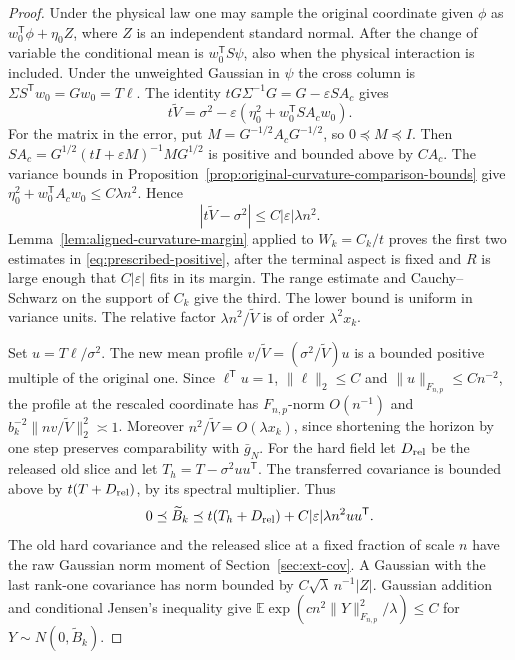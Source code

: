 \documentclass[11pt]{article}
\theoremstyle{definition}
\newcommand{\E}{\mathbb E}
\begin{document}
\begin{proof}
Under the physical law one may sample the original coordinate
given \(\phi\) as \(w_0^{\mathsf T}\phi+\eta_0 Z\), where \(Z\)
is an independent standard normal. After the change of variable
the conditional mean is \(w_0^{\mathsf T}S\psi\), also when
the physical interaction is included. Under the unweighted
Gaussian in \(\psi\) the cross column is
\(\Sigma S^{\mathsf T}w_0=Gw_0=T\ell\). The identity
\(tG\Sigma^{-1}G=G-\varepsilon S A_c\) gives
\begin{equation}
 t\widetilde V=\sigma^2-\varepsilon
             (\eta_0^2+w_0^{\mathsf T}S A_cw_0).
\end{equation}
For the matrix in the error, put \(M=G^{-1/2}A_cG^{-1/2}\),
so \(0\preceq M\preceq I\). Then
\(S A_c=G^{1/2}(tI+\varepsilon M)^{-1}M G^{1/2}\)
is positive and bounded above by \(C A_c\). The variance
bounds in Proposition~\ref{prop:original-curvature-comparison-bounds}
give \(\eta_0^2+w_0^{\mathsf T}A_cw_0\le C\lambda n^2\).
Hence
\begin{equation}
 |t\widetilde V-\sigma^2|\le C|\varepsilon|\lambda n^2 .
\end{equation}
Lemma~\ref{lem:aligned-curvature-margin} applied to
\(W_k=C_k/t\) proves the first two estimates in
\eqref{eq:prescribed-positive}, after the terminal aspect is
fixed and \(R\) is large enough that \(C|\varepsilon|\) fits
in its margin. The range estimate and Cauchy--Schwarz on the
support of \(C_k\) give the third. The lower bound is uniform
in variance units. The relative factor \(\lambda n^2/\widetilde V\)
is of order \(\lambda^2 x_k\).

Set \(u=T\ell/\sigma^2\). The new mean profile
\(v/\widetilde V=(\sigma^2/\widetilde V)u\) is a bounded
positive multiple of the original one. Since
\(\ell^{\mathsf T}u=1\), \(\|\ell\|_2\le C\) and
\(\|u\|_{F_{n,p}}\le Cn^{-2}\), the profile at the rescaled
coordinate has \(F_{n,p}\)-norm \(O(n^{-1})\) and
\(b_k^{-2}\|nv/\widetilde V\|_2^2\asymp1\).
Moreover \(n^2/\widetilde V=O(\lambda x_k)\), since shortening
the horizon by one step preserves comparability with
\(\bar g_N\). For the hard field let \(D_{\rm rel}\) be the
released old slice and let \(T_h=T-\sigma^2 uu^{\mathsf T}\).
The transferred covariance is bounded above by
\(t(T+D_{\rm rel})\), by its spectral multiplier. Thus
\begin{equation}
 0\preceq\widetilde B_k\preceq t(T_h+D_{\rm rel})
                 +C|\varepsilon|\lambda n^2 uu^{\mathsf T}.
\end{equation}
The old hard covariance and the released slice at a fixed
fraction of scale \(n\) have the raw Gaussian norm moment of
Section~\ref{sec:ext-cov}. A Gaussian with the last rank-one
covariance has norm bounded by \(C\sqrt{\lambda}\,n^{-1}|Z|\).
Gaussian addition and conditional Jensen's inequality give
\(\E\exp(c n^2\|Y\|_{F_{n,p}}^2/\lambda)\le C\) for
\(Y\sim N(0,\widetilde B_k)\).


\end{proof}
\end{document}
